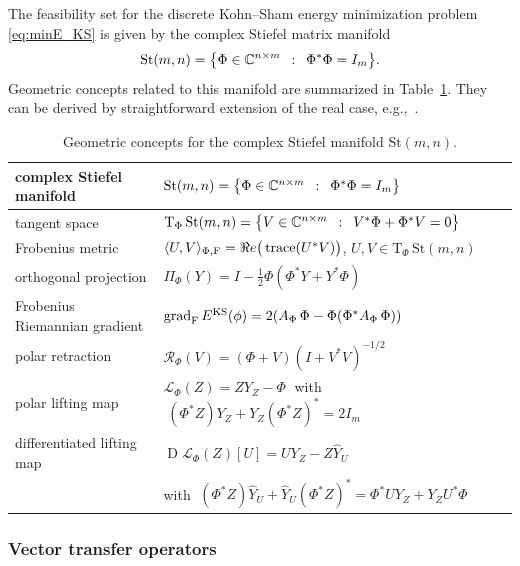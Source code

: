 \documentclass[11pt,reqno]{amsart}
\theoremstyle{plain}
\newcommand\C{\mathbb C}
\DeclareMathOperator{\Drm}{D}
\DeclareMathOperator{\grad}{grad}
\DeclareMathOperator{\trace}{trace}
\newcommand{\Tan}{\mathrm{T}}
\newcommand{\Ret}{\mathcal R}
\newcommand{\invRet}{\mathcal L}
\newcommand{\St}{\mathrm{St}}
\newcommand{\KS}{{\rm KS}}
\begin{document}
	The feasibility set for the discrete Kohn--Sham energy minimization problem \eqref{eq:minE_KS} is given by the complex Stiefel matrix manifold
	\[
	\St(m,n)=\big\{ \Phi\in\C^{n\times m} \enskip :\enskip \Phi^{\ast}\Phi=I_m\big\}.
	\]
	Geometric concepts related to this manifold are summarized in Table~\ref{tab:Stiefel}. They can be derived by straightforward extension of the real case, e.g.,~\cite{ShuA23}.
	
	\begin{table}
		\begin{tabular}{lll}
			\toprule 
			complex Stiefel manifold & $\St(m,n)=\big\{ \Phi\in\C^{n\times m} \enskip :\enskip \Phi^{\ast}\Phi=I _m\big\}$
			\tabularnewline
			\midrule 
			tangent space & $\Tan_\Phi\,\St(m,n) = \big\{ V\in\C^{n\times m} \enskip :\enskip V^{\ast}\Phi+\Phi^{\ast}V=0 \big\}$
			\tabularnewline
			\midrule 
			Frobenius metric & $\langle U,V\rangle_{\Phi, \rm F} = \Re e\big(\trace(U^{\ast} V)\big)$, \; $U,V\in\Tan_{\Phi}\,\St(m,n)$ 
			\tabularnewline
			\midrule 
			orthogonal projection & $\Pi_{\Phi}(Y)=I-\tfrac{1}{2}\Phi(\Phi^{\ast}Y+Y^\ast \Phi)$ 
			\tabularnewline
			\midrule 
			Frobenius Riemannian gradient & $\grad_{\rm F} E^{\KS}(\phi) = 2(A_\Phi\,\Phi - \Phi(\Phi^{\ast} A_\Phi\,\Phi))$
			\tabularnewline
			\midrule 
			polar retraction & $\Ret_\Phi(V)=(\Phi+V)(I+V^{\ast}V)^{-1/2}$\tabularnewline
			\midrule 
			polar lifting map & $\invRet_\Phi(Z)=ZY_Z-\Phi\;$ with $\;(\Phi^{\ast}Z)Y_Z+Y_Z(\Phi^{\ast}Z)^{\ast}=2I_m$
			\tabularnewline
			\midrule 
			differentiated lifting map& $\Drm\invRet_\Phi(Z)[U]=UY_Z-Z\hat{Y}_U$ 
			\tabularnewline
			& with $\;(\Phi^{\ast}Z)\hat{Y}_U+\hat{Y}_U(\Phi^{\ast}Z)^{\ast}=\Phi^{\ast}UY_Z+Y_ZU^{\ast}\Phi$
			\tabularnewline
			\bottomrule
		\end{tabular}
		\caption{Geometric concepts for the complex Stiefel manifold $\St(m,n)$.}
		\label{tab:Stiefel}
	\end{table}
	
	\subsubsection{Vector transfer operators}
	
\end{document}
